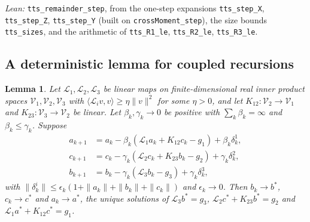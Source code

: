\documentclass[11pt]{article}
\newtheorem{lemma}[theorem]{Lemma}
\theoremstyle{definition}
\theoremstyle{remark}
\newcommand{\Lop}{\mathcal{L}}
\begin{document}
\noindent\emph{Lean:} \texttt{tts\_remainder\_step}, from the one-step expansions
\texttt{tts\_step\_X}, \texttt{tts\_step\_Z}, \texttt{tts\_step\_Y} (built on
\texttt{crossMoment\_step}), the size bounds \texttt{tts\_sizes}, and the arithmetic of
\texttt{tts\_R1\_le}, \texttt{tts\_R2\_le}, \texttt{tts\_R3\_le}.

\subsection{A deterministic lemma for coupled recursions}

\begin{lemma}\label{lem:coupled}
Let $\Lop_1, \Lop_2, \Lop_3$ be linear maps on finite-dimensional real inner product spaces
$\mathcal V_1, \mathcal V_2, \mathcal V_3$ with $\langle\Lop_iv, v\rangle \ge \eta\|v\|^2$ for some
$\eta > 0$, and let $K_{12}\colon \mathcal V_2\to\mathcal V_1$ and $K_{23}\colon\mathcal V_3\to\mathcal V_2$
be linear. Let $\beta_k, \gamma_k \to 0$ be positive with $\sum_k\beta_k = \infty$ and
$\beta_k \le \gamma_k$. Suppose
\begin{align*}
  a_{k+1} &= a_k - \beta_k(\Lop_1a_k + K_{12}c_k - g_1) + \beta_k\delta^1_k,\\
  c_{k+1} &= c_k - \gamma_k(\Lop_2c_k + K_{23}b_k - g_2) + \gamma_k\delta^2_k,\\
  b_{k+1} &= b_k - \gamma_k(\Lop_3b_k - g_3) + \gamma_k\delta^3_k,
\end{align*}
with $\|\delta^i_k\| \le \epsilon_k(1 + \|a_k\| + \|b_k\| + \|c_k\|)$ and $\epsilon_k \to 0$. Then
$b_k \to b^*$, $c_k \to c^*$ and $a_k \to a^*$, the unique solutions of
$\Lop_3b^* = g_3$, $\Lop_2c^* + K_{23}b^* = g_2$ and $\Lop_1a^* + K_{12}c^* = g_1$.
\end{lemma}
\end{document}
